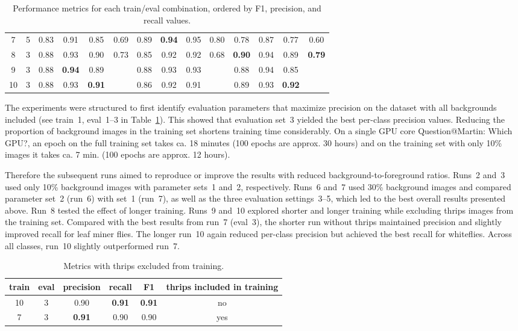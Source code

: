 \documentclass[12pt,a4paper]{article}
\begin{document}
\begin{landscape}
\begin{table}[h!]
\begin{tabular}{cccccccccccccc}
7 & 5 & 0.83 & 0.91 & 0.85 & 0.69 & 0.89 & \textbf{0.94} & 0.95 & 0.80 & 0.78 & 0.87 & 0.77 & 0.60 \\
8 & 3 & 0.88 & 0.93 & 0.90 & 0.73 & 0.85 & 0.92 & 0.92 & 0.68 & \textbf{0.90} & 0.94 & 0.89 & \textbf{0.79} \\
9 & 3 & 0.88 & \textbf{0.94} & 0.89 & & 0.88 & 0.93 & 0.93 & & 0.88 & 0.94 & 0.85 & \\
10 & 3 & 0.88 & 0.93 & \textbf{0.91} & & 0.86 & 0.92 & 0.91 & & 0.89 & 0.93 & \textbf{0.92} & \\
\hline
\end{tabular}
\caption{Performance metrics for each train/eval combination, ordered by F1, precision, and recall values.}
\label{tab:supervised_performance}
\end{table}
\end{landscape}

The experiments were structured to first identify evaluation parameters that maximize precision on the dataset with all backgrounds included (see train~1, eval~1--3 in Table~\ref{tab:supervised_performance}). This showed that evaluation set~3 yielded the best per-class precision values. Reducing the proportion of background images in the training set shortens training time considerably. On a single GPU core {\color{red} Question@Martin: Which GPU?}, an epoch on the full training set takes ca. 18 minutes (100 epochs are approx. 30 hours) and on the training set with only 10\% images it takes ca. 7 min. (100 epochs are approx. 12 hours).

Therefore the subsequent runs aimed to reproduce or improve the results with reduced background-to-foreground ratios. Runs~2 and~3 used only 10\% background images with parameter sets~1 and~2, respectively. Runs~6 and~7 used 30\% background images and compared parameter set~2 (run~6) with set~1 (run~7), as well as the three evaluation settings~3--5, which led to the best overall results presented above. Run~8 tested the effect of longer training. Runs~9 and~10 explored shorter and longer training while excluding thrips images from the training set. Compared with the best results from run~7 (eval~3), the shorter run without thrips maintained precision and slightly improved recall for leaf miner flies. The longer run~10 again reduced per-class precision but achieved the best recall for whiteflies. Across all classes, run~10 slightly outperformed run~7. 

\begin{table}[h!]
\centering
\begin{tabular}{|c|c|c|c|c|c|}
\hline
train & eval & precision & recall & F1 & thrips included in training \\
\hline
10 & 3 & 0.90 & \textbf{0.91} & \textbf{0.91} & no \\
7 & 3 & \textbf{0.91} & 0.90 & 0.90 & yes \\
\hline
\end{tabular}
\caption{Metrics with thrips excluded from training.}
\label{tab:thrips_excluded}
\end{table}
\end{document}
